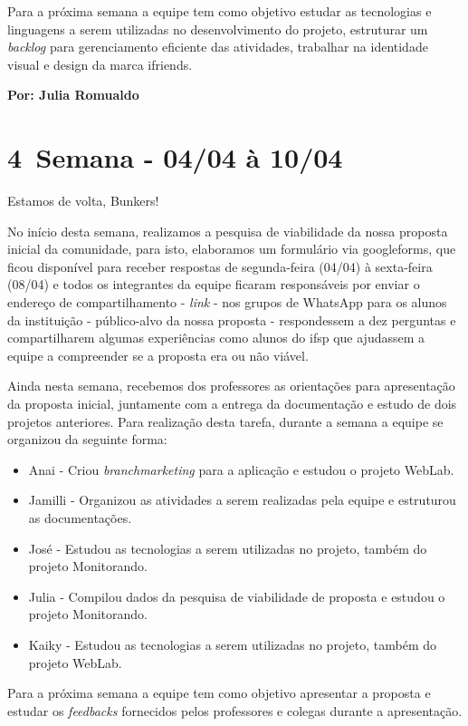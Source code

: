 Para a próxima semana a equipe tem como objetivo estudar as tecnologias e linguagens a serem utilizadas no desenvolvimento do projeto, estruturar um \textsl{backlog} para gerenciamento eficiente das atividades, trabalhar na identidade visual e design da marca \gls{ifriends}.    

\textbf{Por: Julia Romualdo}

\section{4\textordfeminine \, Semana - 04/04 à 10/04}
Estamos de volta, Bunkers!

No início desta semana, realizamos a pesquisa de viabilidade da nossa proposta inicial da comunidade, para isto, elaboramos um formulário via \gls{googleforms}, que ficou disponível para receber respostas de segunda-feira (04/04) à sexta-feira (08/04) e todos os integrantes da equipe ficaram responsáveis por enviar o endereço de compartilhamento - \textsl{link} - nos grupos de \gls{WhatsApp} para os alunos da instituição - público-alvo da nossa proposta - respondessem a dez perguntas e compartilharem algumas experiências como alunos do \acs{ifsp} que ajudassem a equipe a compreender se a proposta era ou não viável.

Ainda nesta semana, recebemos dos professores as orientações para apresentação da proposta inicial, juntamente com a entrega da documentação e estudo de dois projetos anteriores. Para realização desta tarefa, durante a semana a equipe se organizou da seguinte forma:
\begin{itemize}
    \item Anai -  Criou \textsl{branchmarketing} para a aplicação e estudou o projeto WebLab.
    \item Jamilli - Organizou as atividades a serem realizadas pela equipe e estruturou as documentações.
    \item José - Estudou as tecnologias a serem utilizadas no projeto, também do projeto Monitorando.
    \item Julia - Compilou dados da pesquisa de viabilidade de proposta e estudou o  projeto Monitorando.
    \item Kaiky -  Estudou as tecnologias a serem utilizadas no projeto, também do projeto WebLab.
\end{itemize}
Para a próxima semana a equipe tem como objetivo apresentar a proposta e estudar os \textsl{feedbacks} fornecidos pelos professores e colegas durante a apresentação.

